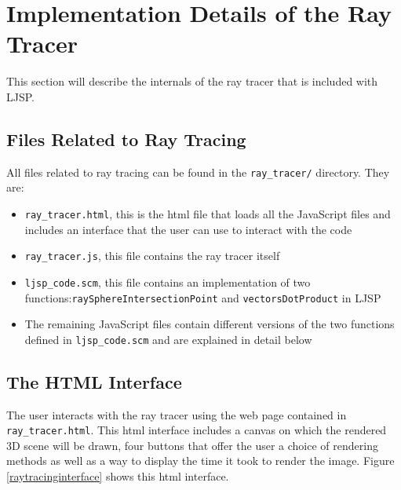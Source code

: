 \documentclass[11pt]{report}
\begin{document}
\section{Implementation Details of the Ray Tracer}
This section will describe the internals of the ray tracer that is included with LJSP.

\subsection{Files Related to Ray Tracing}
All files related to ray tracing can be found in the \texttt{ray_tracer/} directory. They are:
\begin{itemize}
\item \texttt{ray_tracer.html}, this is the html file that loads all the JavaScript files and includes an interface that the user can use to interact with the code
\item \texttt{ray_tracer.js}, this file contains the ray tracer itself
\item \texttt{ljsp_code.scm}, this file contains an implementation of two functions:\texttt{raySphereIntersectionPoint} and \texttt{vectorsDotProduct} in LJSP
\item The remaining JavaScript files contain different versions of the two functions defined in \texttt{ljsp_code.scm} and are explained in detail below
\end{itemize}


\subsection{The HTML Interface}
The user interacts with the ray tracer using the web page contained in \texttt{ray_tracer.html}. This html interface includes a canvas on which the rendered 3D scene will be drawn, four buttons that offer the user a choice of rendering methods as well as a way to display the time it took to render the image. Figure \ref{raytracinginterface} shows this html interface.
\end{document}
